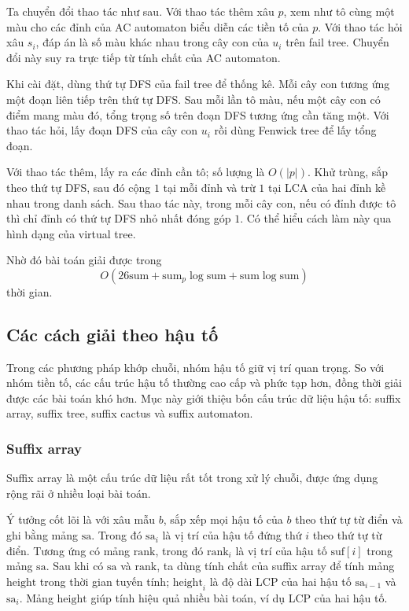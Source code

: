 \documentclass[11pt]{article}
\begin{document}
Ta chuyển đổi thao tác như sau. Với thao tác thêm xâu \(p\), xem như tô cùng một
màu cho các đỉnh của AC automaton biểu diễn các tiền tố của \(p\). Với thao tác
hỏi xâu \(s_i\), đáp án là số màu khác nhau trong cây con của \(u_i\) trên fail
tree. Chuyển đổi này suy ra trực tiếp từ tính chất của AC automaton.

Khi cài đặt, dùng thứ tự DFS của fail tree để thống kê. Mỗi cây con tương ứng
một đoạn liên tiếp trên thứ tự DFS. Sau mỗi lần tô màu, nếu một cây con có điểm
mang màu đó, tổng trọng số trên đoạn DFS tương ứng cần tăng một. Với thao tác
hỏi, lấy đoạn DFS của cây con \(u_i\) rồi dùng Fenwick tree để lấy tổng đoạn.

Với thao tác thêm, lấy ra các đỉnh cần tô; số lượng là \(O(|p|)\). Khử trùng,
sắp theo thứ tự DFS, sau đó cộng \(1\) tại mỗi đỉnh và trừ \(1\) tại LCA của
hai đỉnh kề nhau trong danh sách. Sau thao tác này, trong mỗi cây con, nếu có
đỉnh được tô thì chỉ đỉnh có thứ tự DFS nhỏ nhất đóng góp \(1\). Có thể hiểu
cách làm này qua hình dạng của virtual tree.

Nhờ đó bài toán giải được trong
\[
  O(26\mathrm{sum}+\mathrm{sum}_p\log \mathrm{sum}
    +\mathrm{sum}\log \mathrm{sum})
\]
thời gian.

\subsection{Các cách giải theo hậu tố}

Trong các phương pháp khớp chuỗi, nhóm hậu tố giữ vị trí quan trọng. So với nhóm
tiền tố, các cấu trúc hậu tố thường cao cấp và phức tạp hơn, đồng thời giải
được các bài toán khó hơn. Mục này giới thiệu bốn cấu trúc dữ liệu hậu tố:
suffix array, suffix tree, suffix cactus và suffix automaton.

\subsubsection{Suffix array}

Suffix array là một cấu trúc dữ liệu rất tốt trong xử lý chuỗi, được ứng dụng
rộng rãi ở nhiều loại bài toán.

Ý tưởng cốt lõi là với xâu mẫu \(b\), sắp xếp mọi hậu tố của \(b\) theo thứ tự
từ điển và ghi bằng mảng \(\mathrm{sa}\). Trong đó \(\mathrm{sa}_i\) là vị trí
của hậu tố đứng thứ \(i\) theo thứ tự từ điển. Tương ứng có mảng
\(\mathrm{rank}\), trong đó \(\mathrm{rank}_i\) là vị trí của hậu tố
\(\mathrm{suf}[i]\) trong mảng \(\mathrm{sa}\). Sau khi có \(\mathrm{sa}\) và
\(\mathrm{rank}\), ta dùng tính chất của suffix array để tính mảng
\(\mathrm{height}\) trong thời gian tuyến tính; \(\mathrm{height}_i\) là độ dài
LCP của hai hậu tố \(\mathrm{sa}_{i-1}\) và \(\mathrm{sa}_i\). Mảng
\(\mathrm{height}\) giúp tính hiệu quả nhiều bài toán, ví dụ LCP của hai hậu tố.
\end{document}
